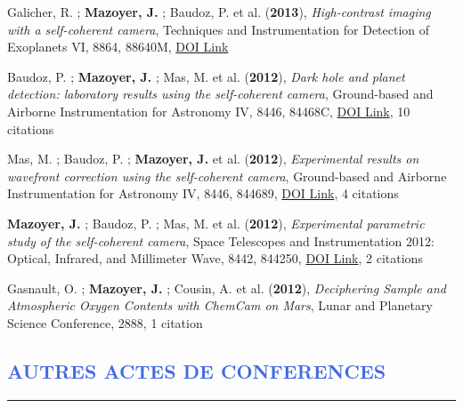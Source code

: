 \documentclass[11pt, a4paper, french]{article}
\begin{document}
\begin{etaremune}
 \item Galicher, R. ; {\bf Mazoyer, J.} ; Baudoz, P. et al. ({\bf2013}), {\it High-contrast imaging with a self-coherent camera}, Techniques and Instrumentation for Detection of Exoplanets VI, 8864, 88640M, \href{https://doi.org/10.1117/12.2025298}{DOI Link}

 \item Baudoz, P. ; {\bf Mazoyer, J.} ; Mas, M. et al. ({\bf2012}), {\it Dark hole and planet detection: laboratory results using the self-coherent camera}, Ground-based and Airborne Instrumentation for Astronomy IV, 8446, 84468C, \href{https://doi.org/10.1117/12.926575}{DOI Link}, 10 citations

 \item Mas, M. ; Baudoz, P. ; {\bf Mazoyer, J.} et al. ({\bf2012}), {\it Experimental results on wavefront correction using the self-coherent camera}, Ground-based and Airborne Instrumentation for Astronomy IV, 8446, 844689, \href{https://doi.org/10.1117/12.926586}{DOI Link}, 4 citations

 \item {\bf Mazoyer, J.} ; Baudoz, P. ; Mas, M. et al. ({\bf2012}), {\it Experimental parametric study of the self-coherent camera}, Space Telescopes and Instrumentation 2012: Optical, Infrared, and Millimeter Wave, 8442, 844250, \href{https://doi.org/10.1117/12.926080}{DOI Link}, 2 citations

 \item Gasnault, O. ; {\bf Mazoyer, J.} ; Cousin, A. et al. ({\bf2012}), {\it Deciphering Sample and Atmospheric Oxygen Contents with ChemCam on Mars}, Lunar and Planetary Science Conference, 2888, 1 citation

 \end{etaremune}



\vspace{-0.5cm}
\textcolor{RoyalBlue}{\section{AUTRES ACTES DE CONFERENCES}
\vspace{-0.25cm}\hrule}
\vspace{0.6cm}
\end{document}
